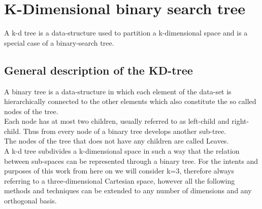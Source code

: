 \chapter{K-Dimensional binary search tree}\label{ch:volume_kd}
A k-d tree is a data-structure used to partition a k-dimensional space and is a special case of a binary-search tree.

\section{General description of the KD-tree}
A binary tree is a data-structure in which each element of the data-set is hierarchically connected to the other elements which also constitute the so called nodes of the tree.\\
Each node has at most two children, usually referred to as left-child and right-child. Thus from every node of a binary tree develops another sub-tree. \\
The nodes of the tree that does not have any children are called Leaves.\\
A k-d tree subdivides a k-dimensional space in such a way that the relation between sub-spaces can be represented through a binary tree.
For the intents and purposes of this work from here on we will consider k=3, therefore always referring to a three-dimensional Cartesian space, however all the following methods and techniques can be extended to any number of dimensions and any orthogonal basis.
  
